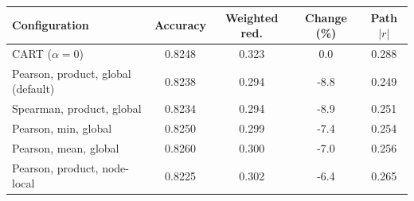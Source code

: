 \begin{tabular}{lcccc}
\toprule
Configuration & Accuracy & Weighted red. & Change (\%) & Path $|r|$ \\
\midrule
CART ($\alpha=0$) & 0.8248 & 0.323 & 0.0 & 0.288 \\
Pearson, product, global (default) & 0.8238 & 0.294 & -8.8 & 0.249 \\
Spearman, product, global & 0.8234 & 0.294 & -8.9 & 0.251 \\
Pearson, min, global & 0.8250 & 0.299 & -7.4 & 0.254 \\
Pearson, mean, global & 0.8260 & 0.300 & -7.0 & 0.256 \\
Pearson, product, node-local & 0.8225 & 0.302 & -6.4 & 0.265 \\
\bottomrule
\end{tabular}
